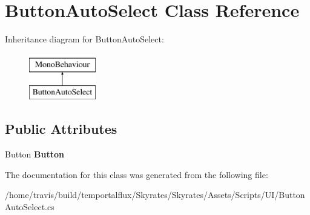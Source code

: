 \hypertarget{class_button_auto_select}{\section{Button\-Auto\-Select Class Reference}
\label{class_button_auto_select}
}
Inheritance diagram for Button\-Auto\-Select\-:\begin{figure}[H]
\begin{center}
\leavevmode
\includegraphics[height=2.000000cm]{class_button_auto_select}
\end{center}
\end{figure}
\subsection*{Public Attributes}
\begin{DoxyCompactItemize}
\item 
\hypertarget{class_button_auto_select_a8a8e26327ebbe99bef711d0b69be0d4f}{Button {\bfseries Button}}\label{class_button_auto_select_a8a8e26327ebbe99bef711d0b69be0d4f}

\end{DoxyCompactItemize}


The documentation for this class was generated from the following file\-:\begin{DoxyCompactItemize}
\item 
/home/travis/build/temportalflux/\-Skyrates/\-Skyrates/\-Assets/\-Scripts/\-U\-I/Button\-Auto\-Select.\-cs\end{DoxyCompactItemize}
